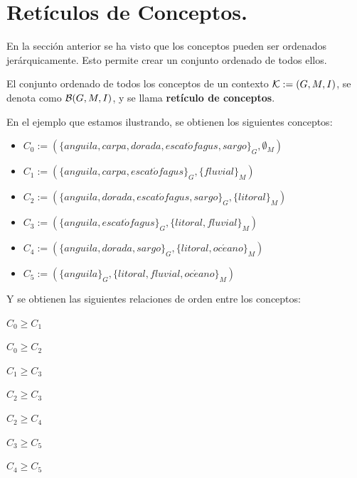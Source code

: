 \section{Retículos de Conceptos.}

En la sección anterior se ha visto que los conceptos pueden ser ordenados jerárquicamente. Esto permite crear un conjunto ordenado de todos ellos.

\begin{defi}
El conjunto ordenado de todos los conceptos de un contexto ${\cal K}:=(G,M,I)$, se denota como ${\cal B}(G,M,I)$, y se llama {\bf retículo de conceptos}.
\end{defi}

En el ejemplo que estamos ilustrando, se obtienen los siguientes conceptos:
\begin{itemize}
	\item $C_0 := (\{anguila, carpa, dorada, escat\acute{o}fagus, sargo\}_G, \emptyset_M)$
	\item $C_1 := (\{anguila, carpa, escat\acute{o}fagus\}_G, \{fluvial\}_M)$
	\item $C_2 := (\{anguila, dorada, escat\acute{o}fagus, sargo\}_G, \{litoral\}_M)$
	\item $C_3 := (\{anguila, escat\acute{o}fagus\}_G, \{litoral, fluvial\}_M)$
	\item $C_4 := (\{anguila, dorada, sargo\}_G, \{litoral, oc\acute{e}ano\}_M)$
	\item $C_5 := (\{anguila\}_G, \{litoral, fluvial, oc\acute{e}ano\}_M)$
\end{itemize}

Y se obtienen las siguientes relaciones de orden entre los conceptos:
\begin{itemize}
  \begin{minipage}[t]{0.3\linewidth} \centering
	\item $C_0 \geq C_1$
	\item $C_0 \geq C_2$
	\item $C_1 \geq C_3$
	\item $C_2 \geq C_3$
  \end{minipage}
   \hspace{0.5cm}
   \begin{minipage}[t]{0.3\linewidth} \centering
	\item $C_2 \geq C_4$
	\item $C_3 \geq C_5$
	\item $C_4 \geq C_5$
   \end{minipage}
\end{itemize}


